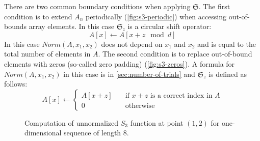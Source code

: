 \documentclass[1p]{elsarticle}
\begin{document}
There are two common boundary conditions when applying $\mathfrak{S}$. The
first condition is to extend $A_n$ periodically (\cref{fig:s3-periodic}) when
accessing out-of-bounds array elements. In this case $\mathfrak{S}_z$ is a
circular shift operator:
\begin{equation}
  A[x] \leftarrow A[x+z \mod d]
\end{equation}
In this case $Norm(A, x_1, x_2)$ does not depend on $x_1$ and $x_2$ and
is equal to the total number of elements in $A$. The second condition is to
replace out-of-bound elements with zeros (so-called zero padding)
(\cref{fig:s3-zeros}). A formula for $Norm(A, x_1, x_2)$ in this case is in
\ref{sec:number-of-trials} and $\mathfrak{S}_z$ is defined as follows:
\begin{equation}
  A[x] \leftarrow \left\{
  \begin{array}{ll}
    A[x+z] & \quad \text{if $x+z$ is a correct index in $A$} \\
    0 & \quad \text{otherwise}
  \end{array}
  \right.
\end{equation}
\begin{figure}[tp]
  \centering
  \hfill
  \caption[]{Computation of unnormalized $S_3$ function at point $(1, 2)$ for
    one-dimensional sequence of length 8.}
  \label{fig:s3-computation}
\end{figure}
\end{document}
